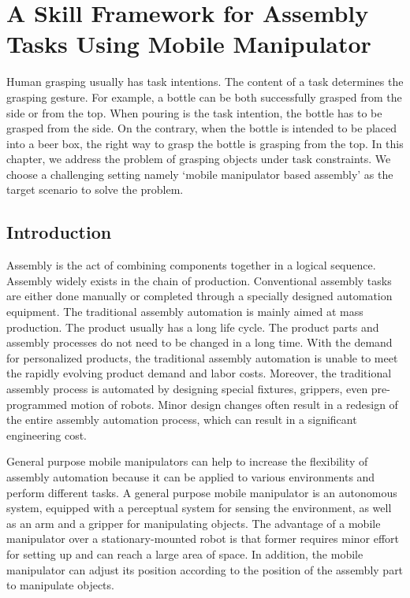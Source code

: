 \chapter{A Skill Framework for Assembly Tasks Using Mobile Manipulator} 
\label{chapter4}
Human grasping usually has task intentions. The content of a task determines the grasping gesture.  For example, a bottle can be both successfully grasped from the side or from the top. When pouring is the task intention, the bottle has to be grasped from the side.  On the contrary, when the bottle is intended to be placed into a beer box, the right way to grasp the bottle is grasping from the top. In this chapter, we address the problem of grasping objects under task constraints. We choose a  challenging setting namely `mobile manipulator based assembly' as the target scenario to solve the problem. 


\section{Introduction}
Assembly is the act of combining components together in a logical sequence. Assembly widely exists in the chain of production. Conventional assembly tasks are either done manually or completed through a specially designed automation equipment. The traditional assembly automation is mainly aimed at mass production. The product usually has a long life cycle. The product parts and assembly processes do not need to be changed in a long time.  With the demand for personalized products, the traditional assembly automation is unable to meet the rapidly evolving product demand and labor costs. Moreover, the traditional assembly process is automated by designing special fixtures, grippers, even pre-programmed motion of robots. Minor design changes often result in a redesign of the entire assembly automation process, which can result in a significant engineering cost. 

General purpose mobile manipulators can help to increase the flexibility of assembly automation because it can be applied to various environments and perform different tasks. A general purpose mobile manipulator is an autonomous system, equipped with a perceptual system for sensing the environment, as well as an arm and a gripper for manipulating objects. The advantage of a mobile manipulator over a stationary-mounted robot is that former requires minor effort for setting up and can reach a large area of space. In addition, the mobile manipulator can adjust its position according to the position of the assembly part to manipulate objects. 

